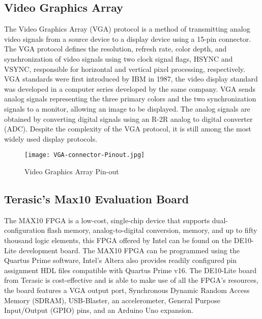 \subsection{Video Graphics Array}
\par The Video Graphics Array (VGA) protocol is a method of transmitting analog video signals from a source device to a display device using a 15-pin connector. The VGA protocol defines the resolution, refresh rate, color depth, and synchronization of video signals using two clock signal flags, HSYNC and VSYNC, responsible for horizontal and vertical pixel processing, respectively.  VGA standards were first introduced by IBM in 1987, the video display standard was developed in a computer series developed by the same company. VGA sends analog signals representing the three primary colors and the two synchronization signals to a monitor, allowing an image to be displayed. The analog signals are obtained by converting digital signals using an R-2R analog to digital converter (ADC). Despite the complexity of the VGA protocol, it is still among the most widely used display protocols.\newline

\begin{figure}[H]
    \centering
    \texttt{[image: VGA-connector-Pinout.jpg]}
    \caption{Video Graphics Array Pin-out \cite{figthree}}
    \label{fig:VGAPinout}   
\end{figure}

\subsection{Terasic's Max10 Evaluation Board}
\par The MAX10 FPGA is a low-cost, single-chip device that supports dual-configuration flash memory, analog-to-digital conversion, memory, and up to fifty thousand logic elements, this FPGA offered by Intel can be found on the DE10-Lite development board. The MAX10 FPGA can be programmed using the Quartus Prime software, Intel's Altera also provides readily configured pin assignment HDL files compatible with Quartus Prime v16. The DE10-Lite board from Terasic is cost-effective and is able to make use of all the FPGA's resources, the board features a VGA output port, Synchronous Dynamic Random Access Memory (SDRAM), USB-Blaster, an accelerometer, General Purpose Input/Output (GPIO) pins, and an Arduino Uno expansion.\newline

